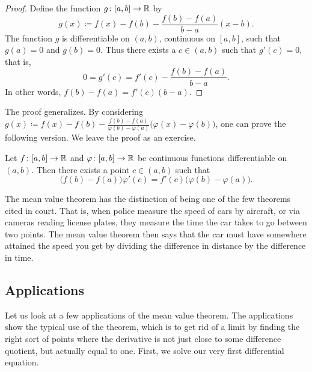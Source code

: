 \begin{proof}
Define the
function $g \colon [a,b] \to {\mathbb{R}}$ by
\begin{equation*}
g(x) \coloneqq f(x)-f(b)-\frac{f(b)-f(a)}{b-a}(x-b) .
\end{equation*}
The function $g$ is differentiable on $(a,b)$,
continuous on $[a,b]$, such that $g(a) = 0$ and $g(b) = 0$.  Thus there exists
a
$c \in (a,b)$ such that $g'(c) = 0$, that is,
\begin{equation*}
0 = g'(c) = f'(c)-\frac{f(b)-f(a)}{b-a} .
\end{equation*}
In other words,
$f(b)-f(a) = f'(c)(b-a)$.
\end{proof}

The proof generalizes.  By considering
$g(x) \coloneqq
f(x)-f(b)-\frac{f(b)-f(a)}{\varphi(b)-\varphi(a)}\bigl(\varphi(x)-\varphi(b)\bigr)$,
one can prove the following version.  We leave the proof as an exercise.

\begin{thm} \label{thm:cauchymvt}
Let $f \colon [a,b] \to {\mathbb{R}}$ and $\varphi \colon [a,b] \to {\mathbb{R}}$ be continuous
functions
differentiable on $(a,b)$.  Then there exists a point $c \in (a,b)$
such that
\begin{equation*}
\bigl(f(b)-f(a)\bigr)\varphi'(c) = f'(c)\bigl(\varphi(b)-\varphi(a)\bigr) .
\end{equation*}
\end{thm}

The mean value theorem has the distinction of being one of the few theorems
cited
in court.  That is, when police measure the speed of cars by aircraft, or
via cameras reading license plates, they 
measure the time the car takes to go between two points.
The mean value theorem then
says that the car must have somewhere attained the speed you get by dividing the
difference in distance by the difference in time.



\subsection{Applications}

Let us look at a few applications of the mean value theorem.
The applications show the typical use of the theorem, which is
to get rid of a limit by finding the right sort of points where the
derivative is not just close to some difference quotient, but actually
equal to one.
First, we solve our very first differential equation.

